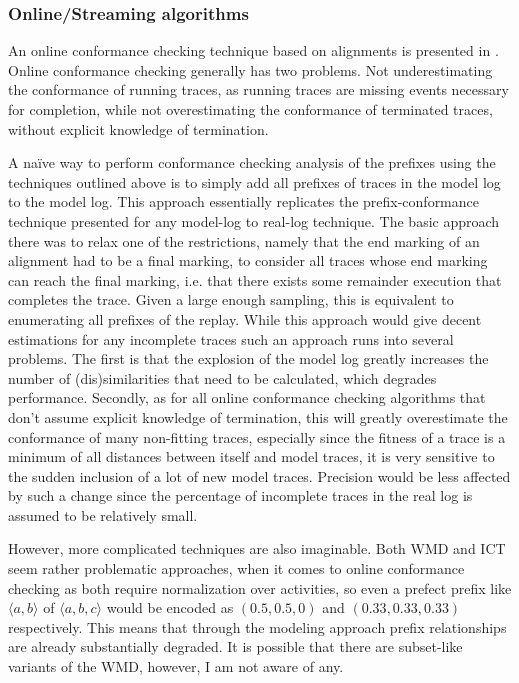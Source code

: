 \documentclass[runningheads]{template/llncs}
\begin{document}
\subsubsection{Online/Streaming algorithms}
An online conformance checking technique based on alignments is presented in \cite{ZBK*19}.
Online conformance checking generally has two problems. Not underestimating the conformance of running traces, as running traces are missing events necessary for completion, while not overestimating the conformance of terminated traces, without explicit knowledge of termination.

A naïve way to perform conformance checking analysis of the prefixes using the techniques outlined above is to simply add all prefixes of traces in the model log  to the model log.
This approach essentially replicates the prefix-conformance technique presented \cite{ZBK*19} for any model-log to real-log technique.
The basic approach there was to relax one of the restrictions, namely that the end marking of an alignment had to be a final marking, to consider all traces whose end marking can reach the final marking, i.e. that there exists some remainder execution that completes the trace.
Given a large enough sampling, this is equivalent to enumerating all prefixes of the replay.
While this approach would give decent estimations for any incomplete traces such an approach runs into several problems.
The first is that the explosion of the model log greatly increases the number of (dis)similarities that need to be calculated, which degrades performance.
Secondly, as for all online conformance checking algorithms that don't assume explicit knowledge of termination, this will greatly overestimate the conformance of many non-fitting traces, especially since the fitness of a trace is a minimum of all distances between itself and model traces, it is very sensitive to the sudden inclusion of a lot of new model traces.
Precision would be less affected by such a change since the percentage of incomplete traces in the real log is assumed to be relatively small.

However, more complicated techniques are also imaginable.
Both WMD and ICT seem rather problematic approaches, when it comes to online conformance checking as both require normalization over activities, so even a prefect prefix like $\langle a,b\rangle$ of $\langle a,b,c\rangle$ would be encoded as $(0.5,0.5,0)$ and $(0.33,0.33,0.33)$ respectively.
This means that through the modeling approach prefix relationships are already substantially degraded.
It is possible that there are subset-like variants of the WMD, however, I am not aware of any.
\end{document}
